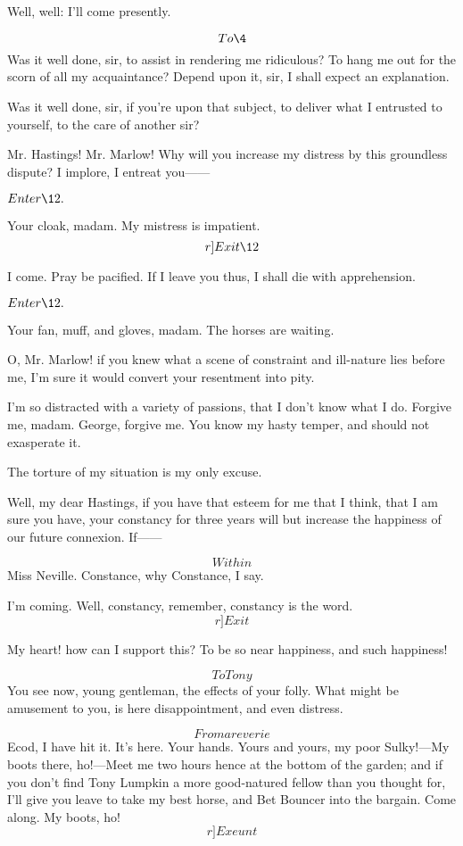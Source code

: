 \documentclass{book}
\begin{document}
\9  Well, well: I'll come presently.

\2  \[To \4\]  Was it well done, sir, to assist in rendering
me ridiculous?  To hang me out for the scorn of all my acquaintance? 
Depend upon it, sir, I shall expect an explanation.

\4  Was it well done, sir, if you're upon that subject, to
deliver what I entrusted to yourself, to the care of another sir?

\9  Mr. Hastings!  Mr. Marlow!  Why will you increase my
distress by this groundless dispute?  I implore, I entreat you------


\(Enter \12.\)


  Your cloak, madam.  My mistress is impatient.  \[r]Exit \12\]

\9  I come.  Pray be pacified.  If I leave you thus, I
shall die with apprehension.


\(Enter \12.\)


  Your fan, muff, and gloves, madam.  The horses are waiting.

\9  O, Mr. Marlow! if you knew what a scene of constraint
and ill-nature lies before me, I'm sure it would convert your
resentment into pity.

\2  I'm so distracted with a variety of passions, that I don't
know what I do.  Forgive me, madam.  George, forgive me.  You know my
hasty temper, and should not exasperate it.

\4  The torture of my situation is my only excuse.

\9  Well, my dear Hastings, if you have that esteem for me
that I think, that I am sure you have, your constancy for three years
will but increase the happiness of our future connexion.  If------

\7  \[Within\]  Miss Neville.  Constance, why Constance, I
say.

\9  I'm coming.  Well, constancy, remember, constancy is the
word.  \[r]Exit\]

\4  My heart! how can I support this?  To be so near happiness,
and such happiness!

\2  \[To Tony\]  You see now, young gentleman, the effects of your
folly.  What might be amusement to you, is here disappointment, and
even distress.

\5  \[From a reverie\]  Ecod, I have hit it.  It's here.  Your
hands.  Yours and yours, my poor Sulky!---My boots there, ho!---Meet me
two hours hence at the bottom of the garden; and if you don't find Tony
Lumpkin a more good-natured fellow than you thought for, I'll give you
leave to take my best horse, and Bet Bouncer into the bargain.  Come
along.  My boots, ho!  \[r]Exeunt\]
\end{document}

